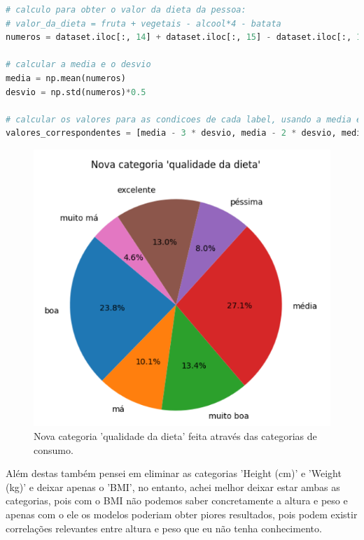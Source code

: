\begin{lstlisting}[caption={Excerto de código utilizado para calcular o valor da dieta a partir das categorias de consumo}, language=Python, label={codigo:dieta}]
# calculo para obter o valor da dieta da pessoa:
# valor_da_dieta = fruta + vegetais - alcool*4 - batata
numeros = dataset.iloc[:, 14] + dataset.iloc[:, 15] - dataset.iloc[:, 13]*4 - dataset.iloc[:, 16]
    
# calcular a media e o desvio
media = np.mean(numeros)
desvio = np.std(numeros)*0.5
    
# calcular os valores para as condicoes de cada label, usando a media e um desvio
valores_correspondentes = [media - 3 * desvio, media - 2 * desvio, media - desvio, media, media + desvio, media + 2 * desvio, media + 3 * desvio]
\end{lstlisting}

\begin{figure}[H]
    \centering
    \includegraphics[scale=0.5]{dieta.png}
    \caption{Nova categoria 'qualidade da dieta' feita através das categorias de consumo.}
    \label{fig:dieta}
\end{figure}

Além destas também pensei em eliminar as categorias 'Height (cm)' e 'Weight (kg)' e deixar apenas o 'BMI', no entanto, achei melhor deixar estar ambas as categorias, pois com o BMI não podemos saber concretamente a altura e peso e apenas com o ele os modelos poderiam obter piores resultados, pois podem existir correlações relevantes entre altura e peso que eu não tenha conhecimento.